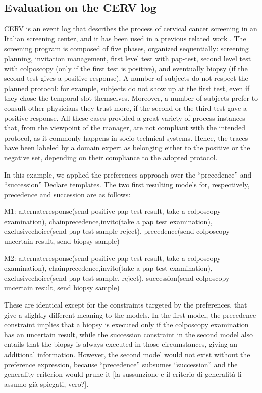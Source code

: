 \subsection{Evaluation on the CERV log}
\label{subsec:cerv}

CERV is an event log that describes the process of cervical cancer screening in an Italian screening center, and it has been used in a previous related work \cite{??,deviant-tkde}. The screening program is composed of five phases, organized sequentially: screening planning, invitation management, first level test with pap-test, second level test with colposcopy (only if the first test is positive), and eventually biopsy (if the second test gives a positive response). A number of subjects do not respect the planned protocol: for example, subjects do not show up at the first test, even if they chose the temporal slot themselves. Moreover, a number of subjects prefer to consult other physicians they trust more, if the second or the third test gave a positive response. All these cases provided a great variety of process instances that, from the viewpoint of the manager, are not compliant with the intended protocol, as it commonly happens in socio-technical systems.
%
Hence, the traces have been labeled by a domain expert as belonging either to the positive or the negative set, depending on their compliance to the adopted protocol.


In this example, we applied the preferences approach over the “precedence” and “succession” Declare templates. The two first resulting models for, respectively, precedence and succession are as follows:

M1: {    alternateresponse(send positive pap test result, take a colposcopy examination), 
chainprecedence,invito(take a pap test examination), 
exclusivechoice(send pap test sample reject),
precedence(send colposcopy uncertain result, send biopsy sample) }

M2: {     alternateresponse(send positive pap test result, take a colposcopy examination),
chainprecedence,invito(take a pap test examination),
exclusivechoice(send pap test sample, reject),
succession(send colposcopy uncertain result, send biopsy sample) }

These are identical except for the constraints targeted by the preferences, that give a slightly different meaning to the models. In the first model, the precedence constraint implies that a biopsy is executed only if the colposcopy examination has an uncertain result, while the succession constraint in the second model also entails that the biopsy is always executed in those circumstances, giving an additional information.
However, the second model would not exist without the preference expression, because “precedence” subsumes “succession” and the generality criterion would prune it [la sussunzione e il criterio di generalità li assumo già spiegati, vero?].  

